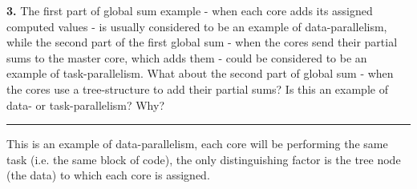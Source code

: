 \documentclass[12pt]{jhwhw}
\begin{document}
\bigbreak
\textbf{3.}
	The first part of global sum example - when each core adds its assigned computed values -
	is usually considered to be an example of data-parallelism, while the second part of the
	first global sum - when the cores send their partial sums to the master core, which adds them
	- could be considered to be an example of task-parallelism. What about the second part
	of global sum - when the cores use a tree-structure to add
	their partial sums? Is this an example of data- or task-parallelism? Why?
\textcolor[RGB]{240,240,240}{\rule{\textwidth}{0.5pt}}\bigbreak

	\begin{addmargin}[1em]{}
		This is an example of data-parallelism, each core will be performing the same
		task (i.e. the same block of code), the only distinguishing factor is the tree
		node (the data) to which each core is assigned.
	\end{addmargin}
\end{document}
